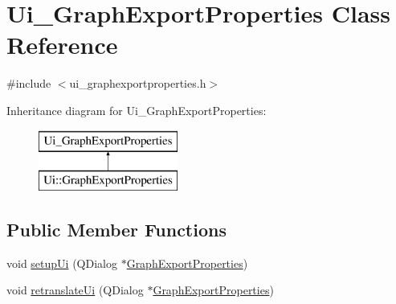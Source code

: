 \hypertarget{class_ui___graph_export_properties}{}\section{Ui\+\_\+\+Graph\+Export\+Properties Class Reference}
\label{class_ui___graph_export_properties}


{\ttfamily \#include $<$ui\+\_\+graphexportproperties.\+h$>$}

Inheritance diagram for Ui\+\_\+\+Graph\+Export\+Properties\+:\begin{figure}[H]
\begin{center}
\leavevmode
\includegraphics[height=2.000000cm]{d3/d0b/class_ui___graph_export_properties}
\end{center}
\end{figure}
\subsection*{Public Member Functions}
\begin{DoxyCompactItemize}
\item 
void \mbox{\hyperlink{class_ui___graph_export_properties_a0419c95551203d0966cce59599eeb970}{setup\+Ui}} (Q\+Dialog $\ast$\mbox{\hyperlink{class_graph_export_properties}{Graph\+Export\+Properties}})
\item 
void \mbox{\hyperlink{class_ui___graph_export_properties_a4c411ef3f2c13425a1d08da19dbb276b}{retranslate\+Ui}} (Q\+Dialog $\ast$\mbox{\hyperlink{class_graph_export_properties}{Graph\+Export\+Properties}})
\end{DoxyCompactItemize}
